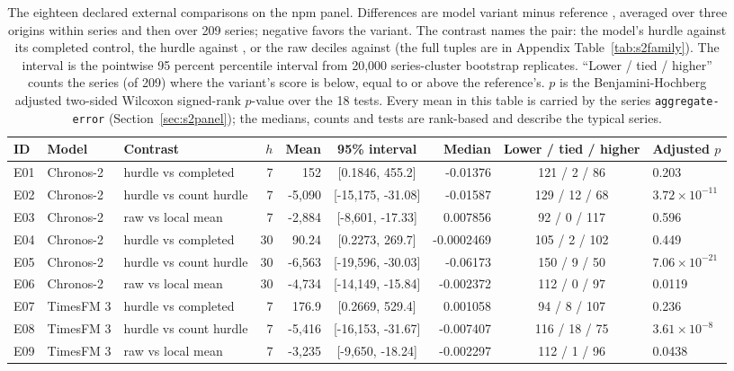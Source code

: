 \begin{table}[t]
\centering\footnotesize\setlength{\tabcolsep}{3.5pt}
\caption{The eighteen declared external comparisons on the npm panel. Differences are model variant minus
reference \qs{}, averaged over three origins within series and then over 209 series; negative favors the
variant. The contrast names the pair: the model's hurdle against its completed control, the hurdle against
\hc{}, or the raw deciles against \lm{} (the full tuples are in Appendix Table~\ref{tab:s2family}). The
interval is the pointwise 95 percent percentile interval from 20,000 series-cluster bootstrap replicates.
``Lower / tied / higher'' counts the series (of 209) where the variant's score is below, equal to or above
the reference's. $p$ is the Benjamini-Hochberg adjusted two-sided Wilcoxon signed-rank $p$-value over the
18 tests. Every mean in this table is carried by the series \texttt{aggregate-error}
(Section~\ref{sec:s2panel}); the medians, counts and tests are rank-based and describe the typical series.}
\label{tab:s2ext}
\begin{tabular}{lllrrcrcl}
\toprule
ID & Model & Contrast & $h$ & Mean & 95\% interval & Median & Lower / tied / higher & Adjusted $p$ \\
\midrule
E01 & Chronos-2 & hurdle vs completed & 7 & 152 & [0.1846, 455.2] & -0.01376 & 121 / 2 / 86 & 0.203 \\
E02 & Chronos-2 & hurdle vs count hurdle & 7 & -5,090 & [-15,175, -31.08] & -0.01587 & 129 / 12 / 68 & $3.72 \times 10^{-11}$ \\
E03 & Chronos-2 & raw vs local mean & 7 & -2,884 & [-8,601, -17.33] & 0.007856 & 92 / 0 / 117 & 0.596 \\
E04 & Chronos-2 & hurdle vs completed & 30 & 90.24 & [0.2273, 269.7] & -0.0002469 & 105 / 2 / 102 & 0.449 \\
E05 & Chronos-2 & hurdle vs count hurdle & 30 & -6,563 & [-19,596, -30.03] & -0.06173 & 150 / 9 / 50 & $7.06 \times 10^{-21}$ \\
E06 & Chronos-2 & raw vs local mean & 30 & -4,734 & [-14,149, -15.84] & -0.002372 & 112 / 0 / 97 & 0.0119 \\
E07 & TimesFM 3 & hurdle vs completed & 7 & 176.9 & [0.2669, 529.4] & 0.001058 & 94 / 8 / 107 & 0.236 \\
E08 & TimesFM 3 & hurdle vs count hurdle & 7 & -5,416 & [-16,153, -31.67] & -0.007407 & 116 / 18 / 75 & $3.61 \times 10^{-8}$ \\
E09 & TimesFM 3 & raw vs local mean & 7 & -3,235 & [-9,650, -18.24] & -0.002297 & 112 / 1 / 96 & 0.0438 \\

\end{tabular}
\end{table}
